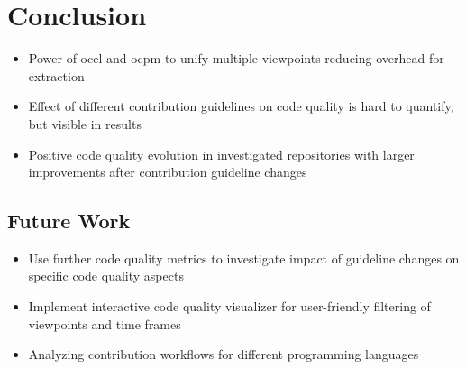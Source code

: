 \chapter{Conclusion}
\label{chap:conclusion}
\begin{itemize}
	\item Power of \ac{ocel} and \ac{ocpm} to unify multiple viewpoints reducing overhead for extraction %
	\item Effect of different contribution guidelines on code quality is hard to quantify, but visible in results
	\item Positive code quality evolution in investigated repositories with larger improvements after contribution guideline changes
\end{itemize}

\section{Future Work}
\begin{itemize}
	\item Use further code quality metrics to investigate impact of guideline changes on specific code quality aspects
	\item Implement interactive code quality visualizer for user-friendly filtering of viewpoints and time frames
	\item Analyzing contribution workflows for different programming languages
\end{itemize}